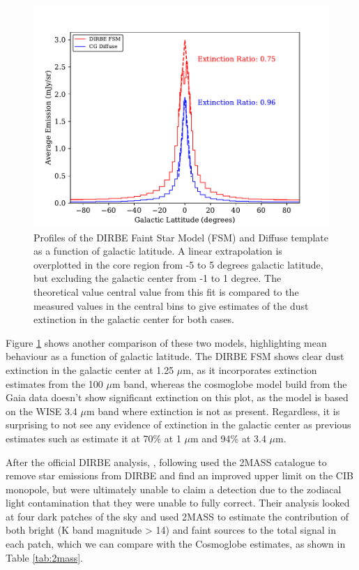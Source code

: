\documentclass{aa}
\begin{document}
\begin{figure}
\includegraphics[width=\columnwidth]{figs/diffuseTemplate/extinction.pdf}
  \caption{Profiles of the DIRBE Faint Star Model (FSM) and Diffuse template as a function of galactic latitude. A linear extrapolation is overplotted in the core region from -5 to 5 degrees galactic latitude, but excluding the galactic center from -1 to 1 degree. The theoretical value central value from this fit is compared to the measured values in the central bins to give estimates of the dust extinction in the galactic center for both cases.}
  \label{fig:extinction}
\end{figure}

Figure \ref{fig:extinction} shows another comparison of these two models, highlighting mean behaviour as a function of galactic latitude. The DIRBE FSM shows clear dust extinction in the galactic center at 1.25 $\mu$m, as it incorporates extinction estimates from the 100 $\mu$m band, whereas the cosmoglobe model build from the Gaia data doesn't show significant extinction on this plot, as the model is based on the WISE 3.4 $\mu$m band where extinction is not as present. Regardless, it is surprising to not see any evidence of extinction in the galactic center as previous estimates such as \cite{extinction} estimate it at 70\% at 1 $\mu$m and 94\% at 3.4 $\mu$m.

After the official DIRBE analysis, \cite{DIRBE2mass}, following \cite{gorjian} used the 2MASS catalogue to remove star emissions from DIRBE and find an improved upper limit on the CIB monopole, but were ultimately unable to claim a detection due to the zodiacal light contamination that they were unable to fully correct. Their analysis looked at four dark patches of the sky and used 2MASS to estimate the contribution of both bright (K band magnitude > 14) and faint sources to the total signal in each patch, which we can compare with the Cosmoglobe estimates, as shown in Table \ref{tab:2mass}.
\end{document}
